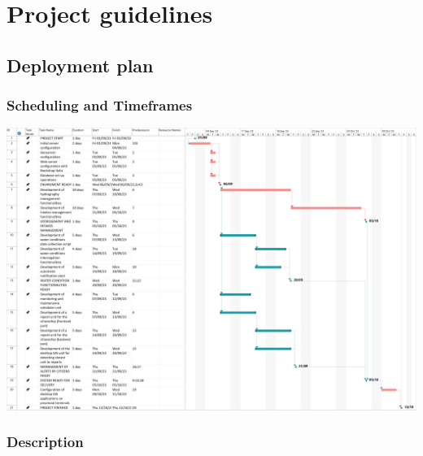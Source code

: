 \section{Project guidelines}
\subsection{Deployment plan}
\subsubsection{Scheduling and Timeframes}
   
\begin{center}
    \includegraphics[width=\textwidth]{img/gantt.png}
\end{center}

\subsubsection{Description}